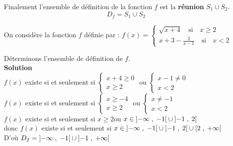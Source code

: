 Finalement l'ensemble de définition  de la fonction $ f $ est la \textbf{réunion}  $S_{1}   \cup S_{2} $.
\[D_{f}=S_{1}   \cup S_{2}\]
\begin{example}
On considère la fonction $ f $ définie par :\;
$ f (x)=\left\{\begin{array}{l} \sqrt{x +4}\quad \textrm{si} \quad x\geq 2 \\ x+3-\frac{2}{x-1}\quad \textrm{si}\quad x< 2  \end{array} \right.$

 Déterminons  l'ensemble de définition de $f $.\\
 
\textbf{Solution}\\
$ f(x) $ existe si et seulement si  $ \begin{cases} x+4 \geq 0 \\ x\geq 2\end{cases}$  ou $ \begin{cases} x-1 \neq 0 \\ x< 2\end{cases}$\\
 $ f(x) $ existe si et seulement si  $ \begin{cases} x \geq -4 \\ x\geq 2\end{cases}$  ou $ \begin{cases} x\neq -1 \\ x< 2\end{cases}$\\
 $ f(x) $ existe si et seulement si   $ x \geq 2 $\quad  ou $ x\in \left]-\infty \;,\; -1\right[\cup \left]-1 \;,\; 2\right[ $ \\ donc $ f(x) $ existe si et seulement si  $ x\in\left]-\infty \;,\; -1\right[\cup \left]-1 \;,\; 2\right[ \cup\left[2 \;,\; +\infty\right[$ \\
 D'où $ D_{f}=\left]-\infty \;,\; -1\right[\cup \left]-1 \;,\; +\infty\right[$
 \end{example}

